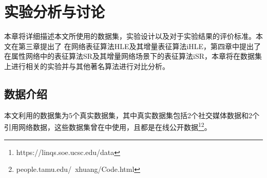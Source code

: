 \chapter{实验分析与讨论}
本章将详细描述本文所使用的数据集，实验设计以及对于实验结果的评价标准。本文在第三章提出了
在网络表征算法HLE及其增量表征算法iHLE，第四章中提出了在属性网络中的表征算法SR及其增量网络场景下的表征算法iSR，本章将在数据集上进行相关的实验并与其他著名算法进行对比分析。

\section{数据介绍}
本文利用的数据集为5个真实数据集，其中真实数据集包括2个社交媒体数据和2个引用网络数据，这些数据集曾在\cite{li2017attributed,tang2015line}中使用，且都是在线公开数据\footnote{https://linqs.soe.ucsc.edu/data}\footnote{people.tamu.edu/~xhuang/Code.html}。
